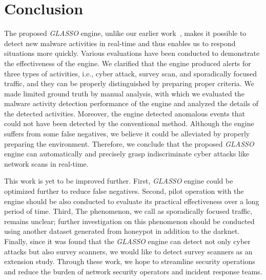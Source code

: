 \documentclass[conference]{IEEEtran}
\begin{document}



\section{Conclusion}
The proposed {\it GLASSO} engine, unlike our earlier work~\cite{Han}, makes it possible to detect new malware activities in real-time and thus enables us to respond situations more quickly.
Various evaluations have been conducted to demonstrate the effectiveness of the engine.
We clarified that the engine produced alerts for three types of activities, i.e., cyber attack, survey scan, and sporadically focused traffic, and they can be properly distinguished by preparing proper criteria.
We made limited ground truth by manual analysis, with which we evaluated the malware activity detection performance of the engine and analyzed the details of the detected activities.
Moreover, the engine detected anomalous events that could not have been detected by the conventional method.
Although the engine suffers from some false negatives, we believe it could be alleviated by properly preparing the environment.
Therefore, we conclude that the proposed {\it GLASSO} engine can automatically and precisely grasp indiscriminate cyber attacks like network scans in real-time.

This work is yet to be improved further.
First, {\it GLASSO} engine could be optimized further to reduce false negatives.
Second, pilot operation with the engine should be also conducted to evaluate its practical effectiveness over a long period of time.
Third, The phenomenon, we call as sporadically focused traffic, remains unclear; further investigation on this phenomenon should be conducted using another dataset generated from honeypot in addition to the darknet.
Finally, since it was found that the {\it GLASSO} engine can detect not only cyber attacks but also survey scanners, we would like to detect survey scanners as an extension study.
Through these work, we hope to streamline security operations and reduce the burden of network security operators and incident response teams.
\end{document}
